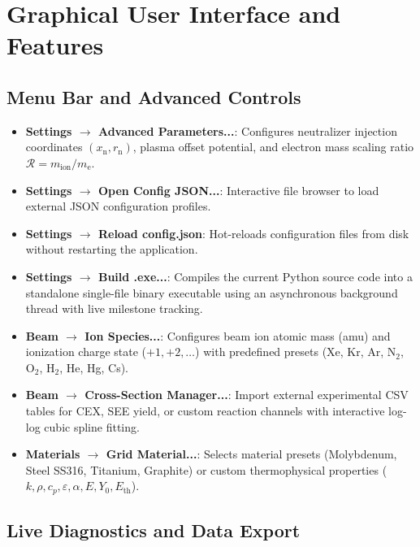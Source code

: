 \documentclass[11pt,a4paper]{article}
\begin{document}
\section{Graphical User Interface and Features}

\subsection{Menu Bar and Advanced Controls}

\begin{itemize}
    \item \textbf{Settings $\rightarrow$ Advanced Parameters...}: Configures neutralizer injection coordinates $(x_{\mathrm{n}}, r_{\mathrm{n}})$, plasma offset potential, and electron mass scaling ratio $\mathcal{R} = m_{\mathrm{ion}}/m_{\mathrm{e}}$.
    \item \textbf{Settings $\rightarrow$ Open Config JSON...}: Interactive file browser to load external JSON configuration profiles.
    \item \textbf{Settings $\rightarrow$ Reload config.json}: Hot-reloads configuration files from disk without restarting the application.
    \item \textbf{Settings $\rightarrow$ Build .exe...}: Compiles the current Python source code into a standalone single-file binary executable using an asynchronous background thread with live milestone tracking.
    \item \textbf{Beam $\rightarrow$ Ion Species...}: Configures beam ion atomic mass (amu) and ionization charge state ($+1, +2, \dots$) with predefined presets (Xe, Kr, Ar, N$_2$, O$_2$, H$_2$, He, Hg, Cs).
    \item \textbf{Beam $\rightarrow$ Cross-Section Manager...}: Import external experimental CSV tables for CEX, SEE yield, or custom reaction channels with interactive log-log cubic spline fitting.
    \item \textbf{Materials $\rightarrow$ Grid Material...}: Selects material presets (Molybdenum, Steel SS316, Titanium, Graphite) or custom thermophysical properties ($k, \rho, c_p, \varepsilon, \alpha, E, Y_0, E_{\mathrm{th}}$).
\end{itemize}

\subsection{Live Diagnostics and Data Export}
\end{document}
